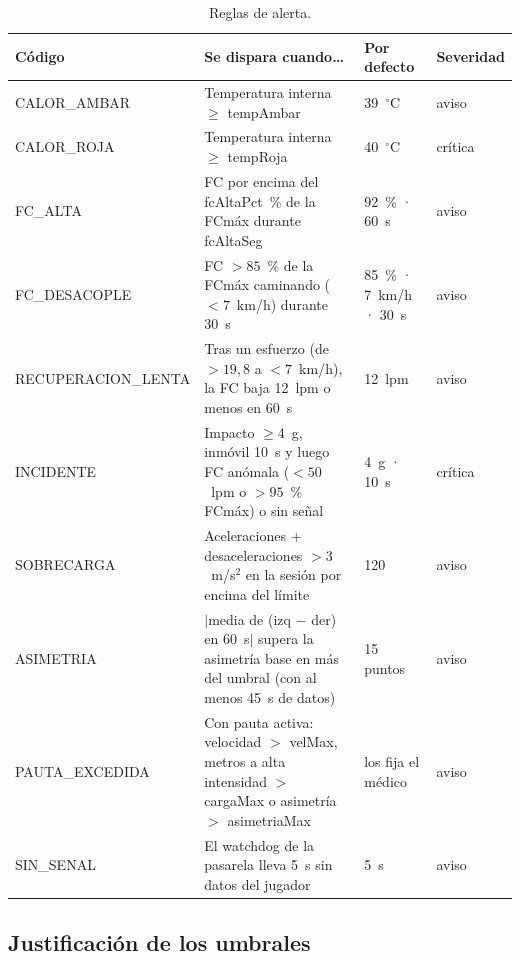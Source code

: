 \documentclass[runningheads]{llncs}
\begin{document}
\begin{table}[!htbp]
\centering
\caption{Reglas de alerta.}\label{tab:reglas}
\scriptsize
\begin{tabularx}{\textwidth}{p{2.6cm}Lp{2.1cm}p{1.35cm}}
\toprule
\textbf{Código} & \textbf{Se dispara cuando\ldots} & \textbf{Por defecto} & \textbf{Severidad} \\
\midrule
CALOR\_AMBAR & Temperatura interna $\geq$ tempAmbar & 39~$^\circ$C & aviso \\
CALOR\_ROJA & Temperatura interna $\geq$ tempRoja & 40~$^\circ$C & crítica \\
FC\_ALTA & FC por encima del fcAltaPct~\% de la FCmáx durante fcAltaSeg & 92~\% · 60~s & aviso \\
FC\_DESACOPLE & FC $>85$~\% de la FCmáx caminando ($<7$~km/h) durante 30~s & 85~\% · 7~km/h · 30~s & aviso \\
RECUPERACION\_LENTA & Tras un esfuerzo (de $>19{,}8$ a $<7$~km/h), la FC baja 12~lpm o menos en 60~s & 12~lpm & aviso \\
INCIDENTE & Impacto $\geq4$~g, inmóvil 10~s y luego FC anómala ($<50$~lpm o $>95$~\% FCmáx) o sin señal & 4~g · 10~s & crítica \\
SOBRECARGA & Aceleraciones + desaceleraciones $>3$~m/s$^2$ en la sesión por encima del límite & 120 & aviso \\
ASIMETRIA & $|$media de (izq $-$ der) en 60~s$|$ supera la asimetría base en más del umbral (con al menos 45~s de datos) & 15 puntos & aviso \\
PAUTA\_EXCEDIDA & Con pauta activa: velocidad $>$ velMax, metros a alta intensidad $>$ cargaMax o asimetría $>$ asimetriaMax & los fija el médico & aviso \\
SIN\_SENAL & El watchdog de la pasarela lleva 5~s sin datos del jugador & 5~s & aviso \\
\bottomrule
\end{tabularx}
\end{table}

\subsection{Justificación de los umbrales}
\end{document}
